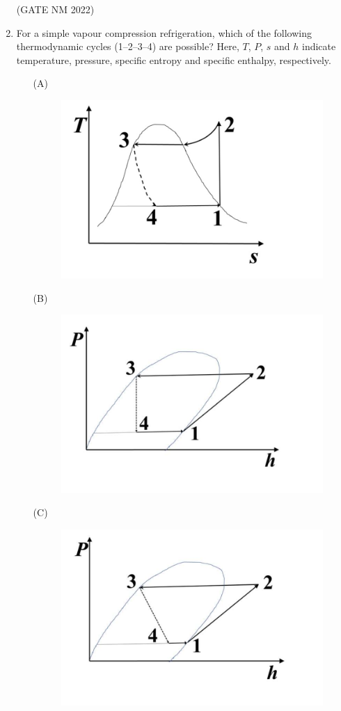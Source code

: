 \documentclass[journal,12pt,onecolumn]{IEEEtran}
\theoremstyle{remark}
\begin{document}
\begin{enumerate}
\hfill(GATE NM 2022)


\item  For a simple vapour compression refrigeration, which of the following thermodynamic cycles (1--2--3--4) are possible?  
Here, $T$, $P$, $s$ and $h$ indicate temperature, pressure, specific entropy and specific enthalpy, respectively.


	\begin{enumerate}
		\item[(A)] \begin{figure}[h]
				\centering
			\includegraphics[width=0.8\columnwidth]{fig8} 
			\caption{}
			\label{fig:placeholder}
		\end{figure}
	\item[(B)]  \begin{figure}[h]
			\centering
			\includegraphics[width=0.8\columnwidth]{fig9} 
			\caption{}
			\label{fig:placeholder}
	\end{figure}
\item [(C)] \begin{figure}[h]
		\centering
			\includegraphics[width=0.8\columnwidth]{fig10}

\end{figure}
\end{enumerate}
\end{enumerate}
\end{document}
